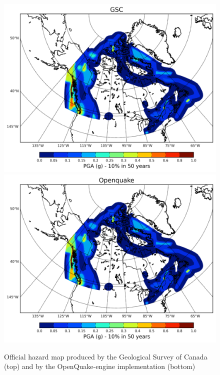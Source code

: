 \begin{figure}
\centering
\includegraphics[width=14cm]{./qareport/pictures/GSC_combined_PGA_0pt1_firm_ground.pdf}
\includegraphics[width=14cm]{./qareport/pictures/OQ_combined_PGA_0pt1_firm_ground.pdf}
\caption{Official hazard map produced by the Geological Survey of Canada (top) and by the OpenQuake-engine implementation (bottom)}
\label{fig:canada_475y_hmaps}
\end{figure}
